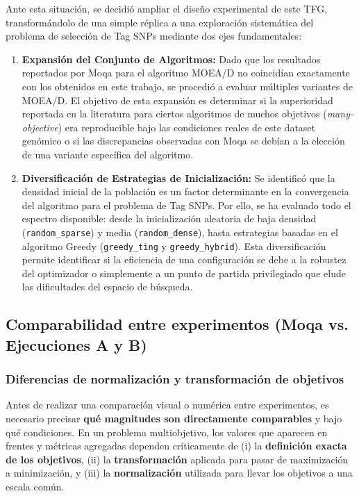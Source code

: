 \documentclass[a4paper,10pt]{article}
\begin{document}
Ante esta situación, se decidió ampliar el diseño experimental de este TFG, transformándolo de una simple réplica a una exploración sistemática del problema de selección de Tag SNPs mediante dos ejes fundamentales:

\begin{enumerate}
    \item \textbf{Expansión del Conjunto de Algoritmos:} Dado que los resultados reportados por Moqa para el algoritmo MOEA/D no coincidían exactamente con los obtenidos en este trabajo, se procedió a evaluar múltiples variantes de MOEA/D. El objetivo de esta expansión es determinar si la superioridad reportada en la literatura para ciertos algoritmos de muchos objetivos (\textit{many-objective}) era reproducible bajo las condiciones reales de este dataset genómico o si las discrepancias observadas con Moqa se debían a la elección de una variante específica del algoritmo.
    
    \item \textbf{Diversificación de Estrategias de Inicialización:} Se identificó que la densidad inicial de la población es un factor determinante en la convergencia del algoritmo para el problema de Tag SNPs. Por ello, se ha evaluado todo el espectro disponible: desde la inicialización aleatoria de baja densidad (\texttt{random\_sparse}) y media (\texttt{random\_dense}), hasta estrategias basadas en el algoritmo Greedy (\texttt{greedy\_ting} y \texttt{greedy\_hybrid}). Esta diversificación permite identificar si la eficiencia de una configuración se debe a la robustez del optimizador o simplemente a un punto de partida privilegiado que elude las dificultades del espacio de búsqueda.
\end{enumerate}

\subsection{Comparabilidad entre experimentos (Moqa vs. Ejecuciones A y B)}
\label{sec:comparabilidad_3_2}

\subsubsection{Diferencias de normalización y transformación de objetivos}

Antes de realizar una comparación visual o numérica entre experimentos, es necesario precisar \textbf{qué magnitudes son directamente comparables} y bajo qué condiciones. En un problema multiobjetivo, los valores que aparecen en frentes y métricas agregadas dependen críticamente de (i) la \textbf{definición exacta de los objetivos}, (ii) la \textbf{transformación} aplicada para pasar de maximización a minimización, y (iii) la \textbf{normalización} utilizada para llevar los objetivos a una escala común.
\end{document}
